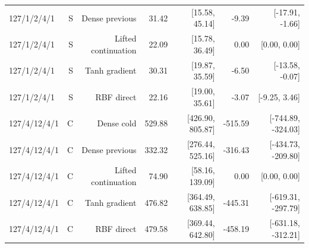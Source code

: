 \documentclass[11pt,letterpaper]{article}
\theoremstyle{definition}
\newcommand{\1}{\mathbf 1}
\begin{document}
\begin{table}[tbp]
\begin{tabular}{lrrrrrr}
127/1/2/4/1 & S & Dense previous & 31.42 & [15.58, 45.14] & -9.39 & [-17.91, -1.66]\\
127/1/2/4/1 & S & Lifted continuation & 22.09 & [15.78, 36.49] & 0.00 & [0.00, 0.00]\\
127/1/2/4/1 & S & Tanh gradient & 30.31 & [19.87, 35.59] & -6.50 & [-13.58, -0.07]\\
127/1/2/4/1 & S & RBF direct & 22.16 & [19.00, 35.61] & -3.07 & [-9.25, 3.46]\\
127/4/12/4/1 & C & Dense cold & 529.88 & [426.90, 805.87] & -515.59 & [-744.89, -324.03]\\
127/4/12/4/1 & C & Dense previous & 332.32 & [276.44, 525.16] & -316.43 & [-434.73, -209.80]\\
127/4/12/4/1 & C & Lifted continuation & 74.90 & [58.16, 139.09] & 0.00 & [0.00, 0.00]\\
127/4/12/4/1 & C & Tanh gradient & 476.82 & [364.49, 638.85] & -445.31 & [-619.31, -297.79]\\
127/4/12/4/1 & C & RBF direct & 479.58 & [369.44, 642.80] & -458.19 & [-631.18, -312.21]\\
\bottomrule
\end{tabular}
\end{table}
\end{document}

